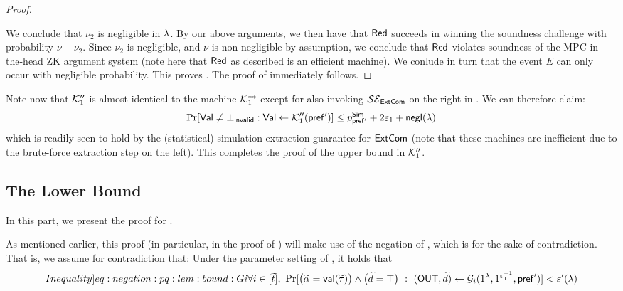 \begin{proof}
\begin{itemize}
\end{itemize}
We conclude that $\nu_2$ is negligible in $\lambda$. By our above arguments, we then have that $\mathsf{Red}$ succeeds in winning the soundness challenge with probability $\nu - \nu_2$. Since $\nu_2$ is negligible, and $\nu$ is non-negligible by assumption, we conclude that $\mathsf{Red}$ violates soundness of the MPC-in-the-head ZK argument system (note here that $\mathsf{Red}$ as described is an efficient machine). We conlude in turn that the event $E$ can only occur with negligible probability. This proves . The proof of  immediately follows. 
\end{proof}



Note now that $\mathcal{K}_1''$ is almost identical to the machine $\mathcal{K}_1^{**}$ except for also invoking $\mathcal{SE}_\mathsf{ExtCom}$ on the right in . We can therefore claim: $$\Pr[\mathsf{Val} \neq \bot_\mathsf{invalid}: \mathsf{Val} \gets \mathcal{K}_1''(\mathsf{pref'})] \leq p^{\mathsf{Sim}}_{\mathsf{pref'}} + 2\varepsilon_1 +\mathsf{negl}(\lambda)$$
which is readily seen to hold by the (statistical) simulation-extraction guarantee for $\mathsf{ExtCom}$ (note that these machines are inefficient due to the brute-force extraction step on the left). This completes the proof of the upper bound in $\mathcal{K}_1''$.  
\fi




\subsection{The Lower Bound}
\label{sec:G''1:lowerbound}
In this part, we present the proof for .

 As mentioned earlier, this proof (in particular, in the proof of ) will make use of the negation of , which is for the sake of contradiction. That is, we assume for contradiction that: Under the parameter setting of , it holds that
\begin{equation}\label[Inequality]{eq:negation:pq:lem:bound:Gi}
 \forall i \in [\tilde{t}],\ \Pr[\big(\tilde{\alpha} = \msf{val}( \tilde{\tau}) \big) \wedge \big(\tilde{d} = \top\big) ~:~(\OUT,\tilde{d}) \gets \mcal{G}_i{(1^\secpar, 1^{\epsilon_1^{-1}},  \msf{pref}')}] < \epsilon'(\secpar)
\end{equation}

